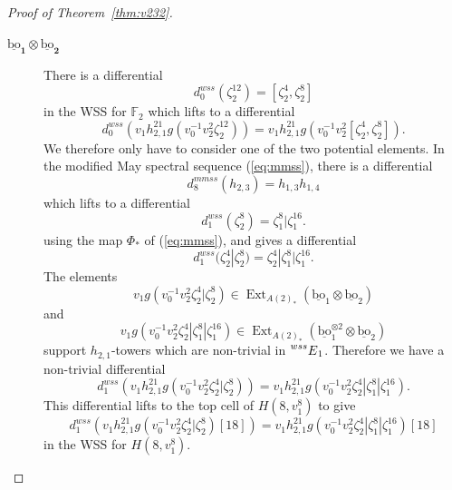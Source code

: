 \documentclass[10pt]{amsart}
\newcommand{\ul}[1]{\underline{#1}}
\newcommand{\FF}{\mathbb{F}}
\newcommand{\bo}{\mathrm{bo}}
\newcommand{\bou}{\ul{\bo}}
\theoremstyle{definition}
\numberwithin{equation}{section}
\numberwithin{figure}{section}
\DeclareMathOperator{\Ext}{Ext}
\newcommand{\E}[2]{\prescript{#1}{#2}{E}}
\begin{document}
\begin{proof}[Proof of Theorem~\ref{thm:v232}]
\begin{description}
\item[$\pmb{\bou_1 \otimes \bou_2}$]
There is a differential
$$ d^{wss}_0(\zeta_2^{12}) = [\zeta_2^4,\zeta_2^8] $$
in the WSS for $\FF_2$ which lifts to a differential
$$ d^{wss}_0(v_1 h_{2,1}^{21} g(v_0^{-1}v_2^2\zeta_2^{12})) = 
v_1 h_{2,1}^{21} g(v_0^{-1}v_2^2[\zeta_2^4,\zeta_2^8]). $$
We therefore only have to consider one of the two potential elements.
In the modified May spectral sequence (\ref{eq:mmss}), there is a differential
$$ d_8^{mmss}(h_{2,3}) = h_{1,3}h_{1,4} $$
which lifts to a differential
$$ d^{wss}_1(\zeta_2^8) = \zeta_1^8|\zeta_1^{16}. $$
using the map $\Phi_*$ of (\ref{eq:mmss}), and gives a differential
$$ d^{wss}_1(\zeta_2^4|\zeta_2^8) = \zeta_2^4|\zeta_1^8|\zeta_1^{16}. $$
The elements 
$$ v_1 g (v_0^{-1}v_2^2\zeta_2^4|\zeta_2^8) \in \Ext_{A(2)_*}(\bou_1 \otimes \bou_2) $$
and
$$ v_1 g (v_0^{-1}v_2^2\zeta_2^4|\zeta_1^8|\zeta_1^{16}) \in \Ext_{A(2)_*}(\bou_1^{\otimes 2} \otimes \bou_2) $$
support $h_{2,1}$-towers which are non-trivial in $\E{wss}{}_1$.  Therefore we have a non-trivial differential
$$ d_1^{wss}(v_1 h_{2,1}^{21} g(v_0^{-1}v_2^2\zeta_2^4|\zeta_2^8))
= v_1 h_{2,1}^{21} g(v_0^{-1}v_2^2\zeta_2^4|\zeta_1^8|\zeta_1^{16}). $$
This differential lifts to the top cell of $H(8,v_1^8)$ to give
$$ d_1^{wss}(v_1 h_{2,1}^{21} g(v_0^{-1}v_2^2\zeta_2^4|\zeta_2^8)[18])
= v_1 h_{2,1}^{21} g(v_0^{-1}v_2^2\zeta_2^4|\zeta_1^8|\zeta_1^{16})[18] $$
in the WSS for $H(8,v_1^8)$.
\vspace{10pt}


\end{description}
\end{proof}
\end{document}
